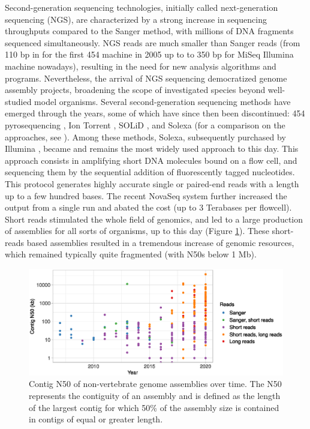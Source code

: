 Second-generation sequencing technologies, initially called next-generation sequencing (NGS), are characterized by a strong increase in sequencing throughputs compared to the Sanger method, with millions of DNA fragments sequenced simultaneously. NGS reads are much smaller than Sanger reads (from 110 bp in for the first 454 machine in 2005 up to to 350 bp for MiSeq Illumina machine nowadays), resulting in the need for new analysis algorithms and programs\cite{pop2008}. Nevertheless, the arrival of NGS sequencing democratized genome assembly projects, broadening the scope of investigated species beyond well-studied model organisms. Several second-generation sequencing methods have emerged through the years, some of which have since then been discontinued: 454 pyrosequencing \cite{pyrosequencing}, Ion Torrent \cite{iontorrent}, SOLiD \cite{solid}, and Solexa (for a comparison on the approaches, see \cite{metzker2010}). Among these methods, Solexa, subsequently purchased by Illumina \cite{illumina}, became and remains the most widely used approach to this day. This approach consists in amplifying short DNA molecules bound on a flow cell, and sequencing them by the sequential addition of fluorescently tagged nucleotides. This protocol generates highly accurate single or paired-end reads with a length up to a few hundred bases. The recent NovaSeq system further increased the output from a single run and abated the cost (up to 3 Terabases per flowcell). Short reads stimulated the whole field of genomics, and led to a large production of assemblies for all sorts of organisms, up to this day (Figure \ref{fig:contig_N50_year}). These short-reads based assemblies resulted in a tremendous increase of genomic resources, which remained typically quite fragmented (with N50s below 1 Mb). \\

\begin{figure}[H]
    \centering
    \includegraphics[width=\textwidth]{fig/review_contig_N50_year.eps}
    \caption{Contig N50 of non-vertebrate genome assemblies over time. The N50 represents the contiguity of an assembly and is defined as the length of the largest contig for which 50\% of the assembly size is contained in contigs of equal or greater length.}
    \label{fig:contig_N50_year}
\end{figure}

